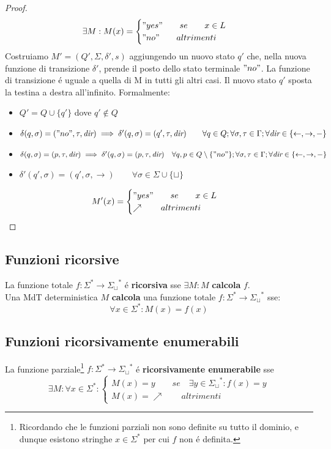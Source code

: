 \begin{proof}
\[\exists M :  M(x) =
\begin{cases}
	"yes" \qquad se \qquad x \in L \\
	"no" \qquad altrimenti
\end{cases}
\]
Costruiamo $M' = (Q', \Sigma, \delta', s)$ aggiungendo un nuovo stato $q'$ che, nella nuova funzione di transizione $\delta'$, prende il posto dello stato terminale $"no"$. La funzione di transizione é uguale a quella di M in tutti gli altri casi. Il nuovo stato $q'$ sposta la testina a destra all'infinito. Formalmente:
\begin{itemize}
	\item $Q' = Q \cup \{q'\}$ \quad dove \quad $q' \notin Q$
	\item $\delta(q, \sigma) = ("no",  \tau, \textit{dir}) \implies \delta'(q, \sigma) = (q', \tau, \textit{dir})  \qquad \forall q \in Q;  \forall \sigma, \tau \in \Gamma;  \forall \textit{dir} \in \{\leftarrow, \rightarrow, -\}$
	\item $\delta(q, \sigma) = (p,  \tau, \textit{dir}) \implies \delta'(q, \sigma) = (p, \tau, \textit{dir})  \quad \forall q, p \in Q \setminus \{"no"\};  \forall \sigma, \tau \in \Gamma;  \forall \textit{dir} \in \{\leftarrow, \rightarrow, -\}$
	\item $\delta'(q', \sigma) = (q', \sigma, \rightarrow) \qquad \forall \sigma \in \Sigma \cup \{\sqcup\}$
\end{itemize}
\[M'(x) =
\begin{cases}
	"yes" \qquad se \qquad x \in L \\
	\nearrow \qquad altrimenti
\end{cases}
\]
\end{proof}


\subsection{Funzioni ricorsive}
La funzione totale $f : \Sigma^* \rightarrow {\Sigma_\sqcup}^*$ é \textbf{ricorsiva} sse $\exists M : M$ \textbf{calcola} $f$. \\
Una MdT deterministica $M$ \textbf{calcola} una funzione totale $f : \Sigma^* \rightarrow {\Sigma_\sqcup}^*$ sse:
\[\forall x \in \Sigma^* : M(x) = f(x) \]


\subsection{Funzioni ricorsivamente enumerabili}
La funzione parziale\footnote{Ricordando che le funzioni parziali non sono definite su tutto il dominio, e dunque esistono stringhe $x \in \Sigma^*$ per cui $f$ non é definita.}  $f : \Sigma^* \rightarrow {\Sigma_\sqcup}^*$ é \textbf{ricorsivamente enumerabile} sse \[\exists M :  \forall x \in \Sigma^* : \begin{cases}
	M(x) = y \qquad se \quad \exists y \in {\Sigma_\sqcup}^* : f(x) = y \\
	M(x) = \nearrow \qquad altrimenti
\end{cases}
\]


